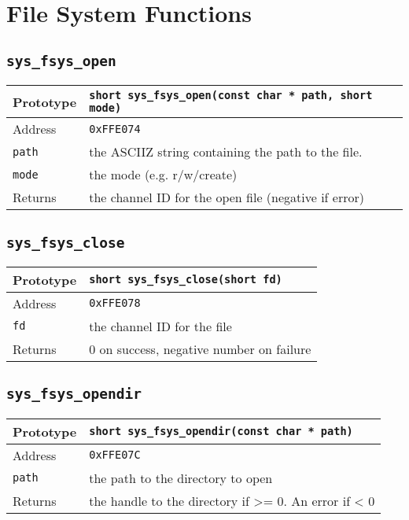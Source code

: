 \section{File System Functions}

\subsection*{\texttt{sys\_fsys\_open}}
\begin{tabular}{|l||l|} \hline
Prototype & \lstinline!short sys_fsys_open(const char * path, short mode)! \\ \hline
Address & \texttt{0xFFE074} \\ \hline
\lstinline!path! & the ASCIIZ string containing the path to the file. \\ \hline
\lstinline!mode! & the mode (e.g. r/w/create) \\ \hline
Returns & the channel ID for the open file (negative if error) \\ \hline
\end{tabular}

\subsection*{\texttt{sys\_fsys\_close}}
\begin{tabular}{|l||l|} \hline
Prototype & \lstinline!short sys_fsys_close(short fd)! \\ \hline
Address & \texttt{0xFFE078} \\ \hline
\lstinline!fd! & the channel ID for the file \\ \hline
Returns & 0 on success, negative number on failure \\ \hline
\end{tabular}

\subsection*{\texttt{sys\_fsys\_opendir}}
\begin{tabular}{|l||l|} \hline
Prototype & \lstinline!short sys_fsys_opendir(const char * path)! \\ \hline
Address & \texttt{0xFFE07C} \\ \hline
\lstinline!path! & the path to the directory to open \\ \hline
Returns & the handle to the directory if >= 0. An error if < 0 \\ \hline
\end{tabular}

